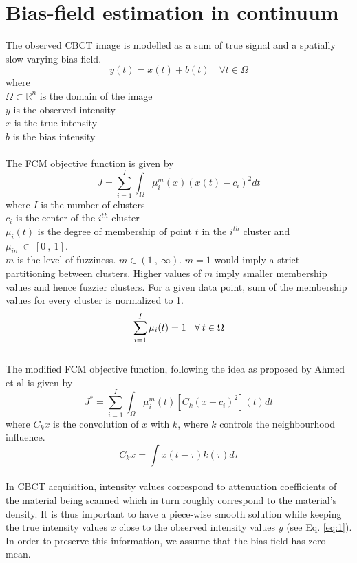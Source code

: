 \documentclass{llncs}
\begin{document}
\section{Bias-field estimation in continuum} 
The observed CBCT image is modelled as a sum of true signal and a spatially slow varying bias-field.
\begin{equation}
\label{eq:1}
y(t) = x(t) + b(t)  \quad \forall t \in \Omega
\end{equation}
where
\\
$\Omega \subset \mathbb{R}^n$ is the domain of the image
\\
$y$ is the observed intensity
\\
$x$ is the true intensity
\\
$b$ is the bias intensity
\\
\\
The FCM objective function is given by
\begin{equation}
J = \sum_{i=1}^{I} \int_{\Omega} {\mu_{i}^m(x)} (x(t)-c_i)^2 dt
\label{eq:FCM}
\end{equation}
where \newline
$I$ is the number of clusters
\\
$c_i$ is the center of the $i^{th}$ cluster
\\
$\mu_{i}(t)$ is the degree of membership of point $t$ in the $i^{th}$ cluster and $\mu_{in}\:\in \: [0\:,\:1]$. 
\\
$m$ is the level of fuzziness. $m \in (1 \:, \:\infty)$. $m=1$ would imply a strict partitioning between clusters. Higher values of $m$ imply smaller membership values and hence fuzzier clusters. For a given data point, sum of the membership values for every cluster is normalized to 1.
\begin{equation}
\label{eq:Constraint1}
 \sum_{i=1}^{I}{\mu_{i}(t)}=1 \: \:\:\: \forall \:t \in \Omega
\\
\end{equation}
\\
The modified FCM objective function, following the idea as proposed by Ahmed et al is given by
\begin{equation}
\label{eq:MFCM}
J^* = \sum_{i=1}^{I} \int_\Omega {\mu_{i}^m}(t) [C_k (x - c_i)^2](t) dt
\end{equation}
where $C_k x$ is the convolution of $x$ with $k$, where $k$ controls the neighbourhood influence.
\[
	C_k x = \int x(t - \tau) k(\tau) d\tau
\]
\\
In CBCT acquisition, intensity values correspond to attenuation coefficients of the material being scanned which in turn roughly correspond to the material's density. It is thus important to have a piece-wise smooth solution while keeping the true intensity values $x$ close to the observed intensity values $y$ (see Eq. \ref{eq:1}). In order to preserve this information, we assume that the bias-field has zero mean.
\end{document}
